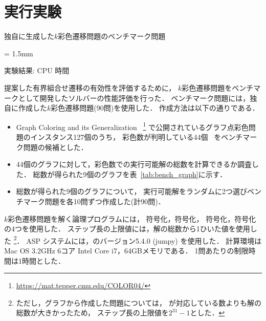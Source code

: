 ﻿%
\section{実行実験}\label{chap:experiment}

\begin{table}[t]\footnotesize
  \centering
  \caption{独自に生成した$k$彩色遷移問題のベンチマーク問題}
  \tabcolsep = 1.5mm
  \label{tab:bench_graph}
  
\end{table}

\begin{table}[h]
  \centering
  \scriptsize
  \caption{実験結果: CPU 時間}
  \label{tab:result_time}
  \renewcommand{\arraystretch}{0.6}
  
\end{table}

提案した有界組合せ遷移の有効性を評価するために，
$k$彩色遷移問題をベンチマークとして開発したソルバーの性能評価を行った．
%
ベンチマーク問題には，独自に作成した$k$彩色遷移問題(90問)を使用した．
作成方法は以下の通りである．
\begin{itemize}
\item Graph Coloring and its Generalization~%
  \footnote{\url{https://mat.tepper.cmu.edu/COLOR04/}}
  で公開されているグラフ点彩色問題のインスタンス127個のうち，
  彩色数が判明している44個~\cite{DBLP:journals/constraints/TamuraTKB09}
  をベンチマーク問題の候補とした．
\item 44個のグラフに対して，彩色数での実行可能解の総数を計算できるか調査した．
  総数が得られた9個のグラフを表~\ref{tab:bench_graph}に示す．
\item 総数が得られた9個のグラフについて，
  実行可能解をランダムに2つ選びベンチマーク問題を各10問ずつ作成した(計90問)．
\end{itemize}

$k$彩色遷移問題を解く論理プログラムには，
符号化，符号化，
符号化，符号化
の4つを使用した．
ステップ長の上限値には，解の総数から1ひいた値を使用した
\footnote{ただし，グラフから作成した問題については，
{\clingo}が対応している数よりも解の総数が大きかったため，
ステップ長の上限値を$2^{31}-1$とした．}．
ASP システムには，{\clingo}のバージョン5.4.0 (jumpy) を使用した．
計算環境は Mac OS 3.2GHz 6コア Intel Core i7，64GBメモリである．
1問あたりの制限時間は1時間とした．

